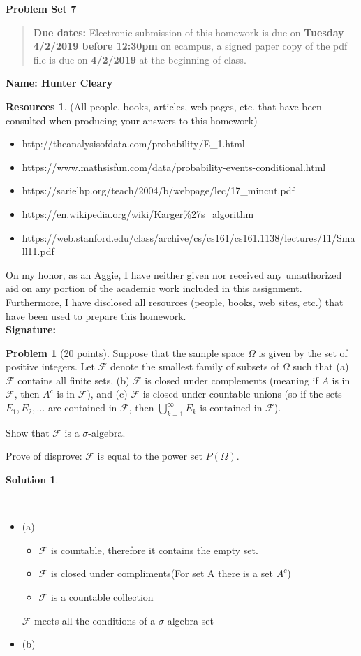 \documentclass{article}
\theoremstyle{definition}
\newtheorem{problem}{Problem}
\newtheorem*{solution}{Solution}
\newtheorem*{resources}{Resources}
\newcommand{\name}[1]{\noindent\textbf{Name: #1}}
\newcommand{\honor}{\noindent On my honor, as an Aggie, I have neither
  given nor received any unauthorized aid on any portion of the
  academic work included in this assignment. Furthermore, I have
  disclosed all resources (people, books, web sites, etc.) that have
  been used to prepare this homework. \\[1ex]
 \textbf{Signature:} \underline{\hspace*{5cm}} }
\newcommand{\problemset}[1]{\begin{center}\textbf{Problem Set
      #1}\end{center}}
\newcommand{\duedate}[2]{\begin{quote}\textbf{Due dates:} Electronic
    submission of this homework is due on \textbf{#1} on ecampus, a
    signed paper copy of the pdf file is due on \textbf{#2} at the
    beginning of class. \end{quote} }
\begin{document}
\problemset{7}
\duedate{Tuesday 4/2/2019 before 12:30pm}{4/2/2019}
\name{ Hunter Cleary }
\begin{resources} (All people, books, articles, web pages, etc. that
  have been consulted when producing your answers to this homework)
  \begin{itemize}
      \item http://theanalysisofdata.com/probability/E\_1.html
      \item https://www.mathsisfun.com/data/probability-events-conditional.html
      \item https://sarielhp.org/teach/2004/b/webpage/lec/17\_mincut.pdf
      \item https://en.wikipedia.org/wiki/Karger\%27s\_algorithm
      \item https://web.stanford.edu/class/archive/cs/cs161/cs161.1138/lectures/11/Small11.pdf
  \end{itemize}
  
\end{resources}
\honor

\newpage


\begin{problem}[20 points] 
Suppose that the sample space $\Omega$ is given by the set of positive
integers. Let $\mathcal{F}$ denote the smallest family of subsets of
$\Omega$ such that (a) $\mathcal{F}$ contains all finite sets, (b)
$\mathcal{F}$ is closed under
complements (meaning if $A$ is in $\mathcal{F}$, then $A^c$ is in
$\mathcal{F}$), and (c) $\mathcal{F}$ is closed under countable
unions (so if the sets $E_1, E_2,  \ldots$ are contained in
$\mathcal{F}$, then $\bigcup_{k=1}^\infty E_k$ is contained in
$\mathcal{F}$). 
\begin{compactenum}[(a)]
\item Show that $\mathcal{F}$ is a $\sigma$-algebra. 
\item Prove of disprove: $\mathcal{F}$ is equal to the power set
  $P(\Omega)$. 
\end{compactenum}
\end{problem}
\begin{solution}
\end{solution} \\
\begin{itemize}
    \item (a)
    \begin{itemize}
        \item $\mathcal{F}$ is countable, therefore it contains the empty set.
        \item $\mathcal{F}$ is closed under compliments(For set A there is a set $A^c$)
        \item $\mathcal{F}$ is a countable collection
    \end{itemize}
    $\mathcal{F}$ meets all the conditions of a $\sigma$-algebra set
    \item (b)
    
\end{itemize}
\end{document}

